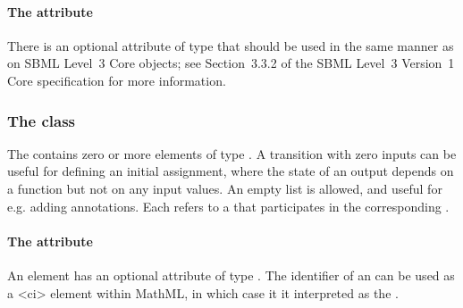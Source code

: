 \paragraph{The  attribute}
There is an optional  attribute of type  that should be used
in the same manner as on SBML Level~3 Core
objects; see Section~3.3.2 of the SBML Level~3 Version~1 Core
specification for more information.

%
%

\subsubsection{The  class}
\label{input-class}
The \ListOfInputs contains zero or more elements of type \Input. A transition with zero inputs can be useful for defining an initial assignment, where the state of an output depends on a function but not on any input values. An empty list is allowed, and useful for e.g. adding annotations.
Each \Input refers to a \QualitativeSpecies that participates in the corresponding \Transition.

\paragraph{The  attribute}
An \Input element has an optional  attribute of type . The identifier of an \Input can be used as a 
<ci> element within MathML, in which case it it interpreted as the .

